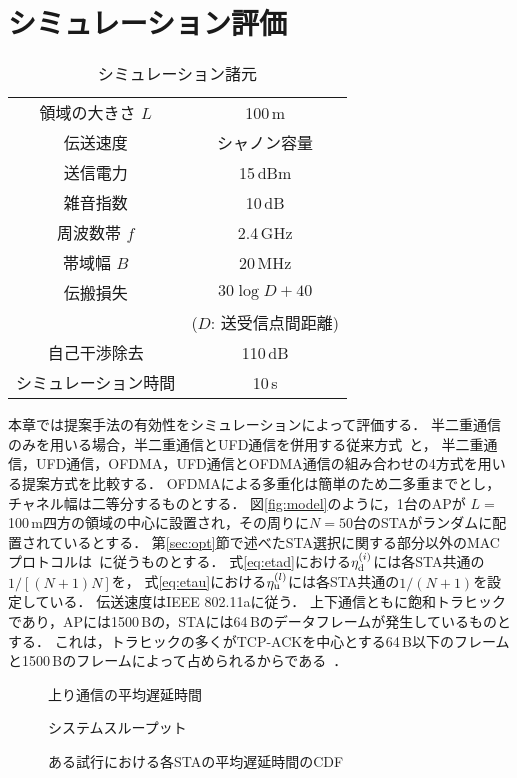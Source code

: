 \documentclass[technicalreport]{ieicej}
\begin{document}
\section{シミュレーション評価}

	\begin{table}[t]
		\centering
		\caption{シミュレーション諸元}
		\label{tab:param}
		\begin{tabular}{cc} \hline
			領域の大きさ $L$ & 100\,m \\
			伝送速度 & シャノン容量 \\
			送信電力 & 15\,dBm \\
			雑音指数 & 10\,dB \\
			周波数帯 $f$& 2.4\,GHz \\
			帯域幅 $B$ & 20\,MHz \\
			伝搬損失 & $30\log D + 40$\\
			&($D$: 送受信点間距離)\\
			自己干渉除去 & 110\,dB \\
			シミュレーション時間 & 10\,s \\\hline
		\end{tabular}
	\end{table}

	本章では提案手法の有効性をシミュレーションによって評価する．
	半二重通信のみを用いる場合，半二重通信とUFD通信を併用する従来方式~\cite{promac_fair}と，
	半二重通信，UFD通信，OFDMA，UFD通信とOFDMA通信の組み合わせの4方式を用いる提案方式を比較する．
	OFDMAによる多重化は簡単のため二多重までとし，チャネル幅は二等分するものとする．
	図\ref{fig:model}のように，1台のAPが $L=$100\,m四方の領域の中心に設置され，その周りに$N=50$台のSTAがランダムに配置されているとする．
	第\ref{sec:opt}節で述べたSTA選択に関する部分以外のMACプロトコルは~\cite{promac}に従うものとする．
	式\eqref{eq:etad}における$\eta_{\rm d}^{(i)}$には各STA共通の$1/[(N+1)N]$を，
	式\eqref{eq:etau}における$\eta_{\rm u}^{(l)}$には各STA共通の$1/(N+1)$を設定している．
	伝送速度はIEEE 802.11aに従う．
	上下通信ともに飽和トラヒックであり，APには1500\,Bの，STAには64\,Bのデータフレームが発生しているものとする．
	これは，トラヒックの多くがTCP-ACKを中心とする64\,B以下のフレームと1500\,Bのフレームによって占められるからである~\cite{traffic}．

		\begin{figure}[t]
			\centering
			\caption{上り通信の平均遅延時間}
			\label{fig:delay}
		\end{figure}
		\begin{figure}[t]
			\centering
			\caption{システムスループット}
			\label{fig:thr}
		\end{figure}
		\begin{figure}[t]
			\centering
			\caption{ある試行における各STAの平均遅延時間のCDF}
			\label{fig:cdf}
		\end{figure}
\end{document}
